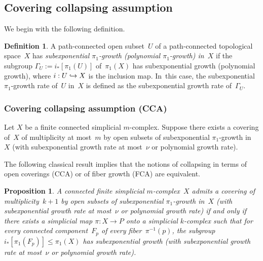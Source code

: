 \documentclass[10pt]{amsart}
\newcommand\hto{\mathrel{\lhook\joinrel\to}}
\newtheorem{proposition}[theorem]{Proposition}
\theoremstyle{definition}
\newtheorem{definition}[theorem]{Definition}
\begin{document}
\subsection{Covering collapsing assumption} \label{sec:zerovol}
We begin with the following definition.

\begin{definition} \label{def:subexp}
A path-connected open subset~$U$ of a path-connected topological space~$X$ has \emph{subexponential $\pi_1$-growth (\resp polynomial $\pi_1$-growth) in~$X$} if the subgroup $\Gamma_U:=i_*[\pi_1(U)]$ of~$\pi_1(X)$ has subexponential growth (\resp polynomial growth), where $i:U \hto X$ is the inclusion map. In~this case, the subexponential $\pi_1$-growth rate of~$U$ in~$X$ is defined as the subexponential growth rate of~$\Gamma_U$.
\end{definition}

\subsubsection*{Covering collapsing assumption (CCA)}
Let $X$ be a finite connected simplicial $m$\nobreakdash-complex.
Suppose there exists a covering of~$X$ of multiplicity at most~$m$ by open subsets of subexponential $\pi_1$-growth in~$X$ (with subexponential growth rate at most~$\nu$ or polynomial growth rate).

The following classical result implies that the notions of collapsing in terms of open coverings (CCA) or of fiber growth (FCA) are equivalent.

\begin{proposition} \label{prop:cover}
A connected finite simplicial $m$\nobreakdash-complex~$X$ admits a covering of multiplicity~$k+1$ by open subsets of subexponential $\pi_1$-growth in~$X$ (with subexponential growth rate at most~$\nu$ or polynomial growth rate) if and only if there exists a simplicial map $\pi:X \to P$ onto a simplicial $k$-complex such that for every connected component~$F_p$ of every fiber~$\pi^{-1}(p)$, the subgroup $i_*[\pi_1(F_p)] \leqslant \pi_1(X)$ has subexponential growth (with subexponential growth rate at most~$\nu$ or polynomial growth rate).
\end{proposition}
\end{document}
